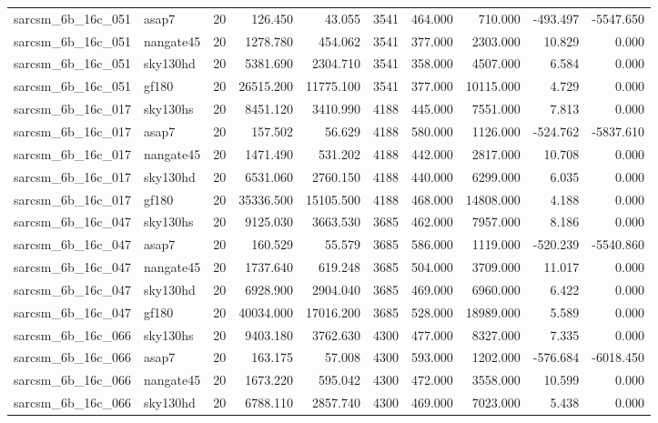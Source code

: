 \documentclass{article}
\begin{document}
\begin{longtable}{llrrrrrrrr}
sarcsm\_6b\_16c\_051 & asap7 & 20 & 126.450 & 43.055 & 3541 & 464.000 & 710.000 & -493.497 & -5547.650 \\
sarcsm\_6b\_16c\_051 & nangate45 & 20 & 1278.780 & 454.062 & 3541 & 377.000 & 2303.000 & 10.829 & 0.000 \\
sarcsm\_6b\_16c\_051 & sky130hd & 20 & 5381.690 & 2304.710 & 3541 & 358.000 & 4507.000 & 6.584 & 0.000 \\
sarcsm\_6b\_16c\_051 & gf180 & 20 & 26515.200 & 11775.100 & 3541 & 377.000 & 10115.000 & 4.729 & 0.000 \\
sarcsm\_6b\_16c\_017 & sky130hs & 20 & 8451.120 & 3410.990 & 4188 & 445.000 & 7551.000 & 7.813 & 0.000 \\
sarcsm\_6b\_16c\_017 & asap7 & 20 & 157.502 & 56.629 & 4188 & 580.000 & 1126.000 & -524.762 & -5837.610 \\
sarcsm\_6b\_16c\_017 & nangate45 & 20 & 1471.490 & 531.202 & 4188 & 442.000 & 2817.000 & 10.708 & 0.000 \\
sarcsm\_6b\_16c\_017 & sky130hd & 20 & 6531.060 & 2760.150 & 4188 & 440.000 & 6299.000 & 6.035 & 0.000 \\
sarcsm\_6b\_16c\_017 & gf180 & 20 & 35336.500 & 15105.500 & 4188 & 468.000 & 14808.000 & 4.188 & 0.000 \\
sarcsm\_6b\_16c\_047 & sky130hs & 20 & 9125.030 & 3663.530 & 3685 & 462.000 & 7957.000 & 8.186 & 0.000 \\
sarcsm\_6b\_16c\_047 & asap7 & 20 & 160.529 & 55.579 & 3685 & 586.000 & 1119.000 & -520.239 & -5540.860 \\
sarcsm\_6b\_16c\_047 & nangate45 & 20 & 1737.640 & 619.248 & 3685 & 504.000 & 3709.000 & 11.017 & 0.000 \\
sarcsm\_6b\_16c\_047 & sky130hd & 20 & 6928.900 & 2904.040 & 3685 & 469.000 & 6960.000 & 6.422 & 0.000 \\
sarcsm\_6b\_16c\_047 & gf180 & 20 & 40034.000 & 17016.200 & 3685 & 528.000 & 18989.000 & 5.589 & 0.000 \\
sarcsm\_6b\_16c\_066 & sky130hs & 20 & 9403.180 & 3762.630 & 4300 & 477.000 & 8327.000 & 7.335 & 0.000 \\
sarcsm\_6b\_16c\_066 & asap7 & 20 & 163.175 & 57.008 & 4300 & 593.000 & 1202.000 & -576.684 & -6018.450 \\
sarcsm\_6b\_16c\_066 & nangate45 & 20 & 1673.220 & 595.042 & 4300 & 472.000 & 3558.000 & 10.599 & 0.000 \\
sarcsm\_6b\_16c\_066 & sky130hd & 20 & 6788.110 & 2857.740 & 4300 & 469.000 & 7023.000 & 5.438 & 0.000 \\

\end{longtable}
\end{document}
